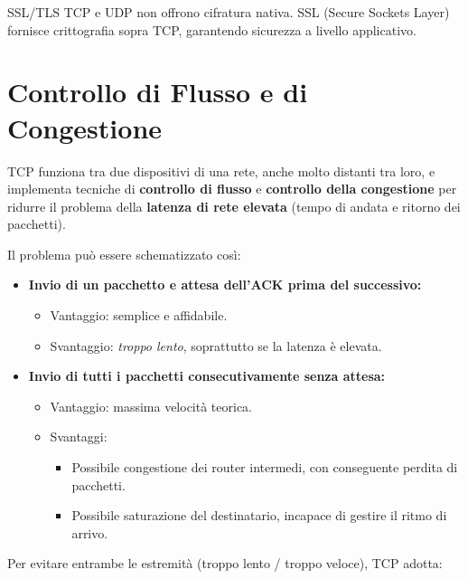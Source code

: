 \documentclass[a4paper,12pt]{report}
\begin{document}
\begin{notebox}{SSL/TLS}
TCP e UDP non offrono cifratura nativa. SSL (Secure Sockets Layer) fornisce crittografia sopra TCP, garantendo sicurezza a livello applicativo.
\end{notebox}



\section*{Controllo di Flusso e di Congestione}

TCP funziona tra due dispositivi di una rete, anche molto distanti tra loro, e implementa tecniche di \textbf{controllo di flusso} e \textbf{controllo della congestione} per ridurre il problema della \textbf{latenza di rete elevata} (tempo di andata e ritorno dei pacchetti).

Il problema può essere schematizzato così:

\begin{itemize}
    \item \textbf{Invio di un pacchetto e attesa dell’ACK prima del successivo:}
    \begin{itemize}
        \item Vantaggio: semplice e affidabile.
        \item Svantaggio: \textit{troppo lento}, soprattutto se la latenza è elevata.
    \end{itemize}

    \item \textbf{Invio di tutti i pacchetti consecutivamente senza attesa:}
    \begin{itemize}
        \item Vantaggio: massima velocità teorica.
        \item Svantaggi:
        \begin{itemize}
            \item Possibile congestione dei router intermedi, con conseguente perdita di pacchetti.
            \item Possibile saturazione del destinatario, incapace di gestire il ritmo di arrivo.
        \end{itemize}
    \end{itemize}
\end{itemize}

Per evitare entrambe le estremità (troppo lento / troppo veloce), TCP adotta:
\end{document}
